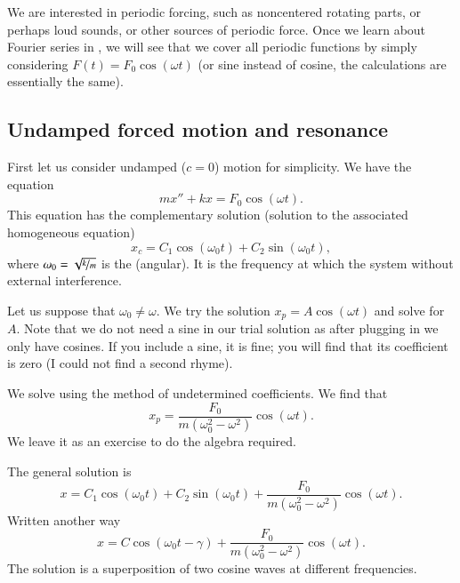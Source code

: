 We are interested in periodic
forcing, such as noncentered rotating parts, or perhaps loud sounds, or
other sources of periodic force.  Once we learn about Fourier series in
, we
will see that we cover all periodic functions
by simply considering $F(t) = F_0 \cos (\omega t)$ (or sine instead of cosine,
the calculations are essentially the same).

\subsection{Undamped forced motion and resonance}

First let us consider undamped ($c=0$) motion for simplicity.
We have the equation
\begin{equation*}
mx'' + kx = F_0 \cos (\omega t) .
\end{equation*}
This equation has the complementary solution (solution to the associated homogeneous
equation)
\begin{equation*}
x_c = C_1 \cos (\omega_0 t) + C_2 \sin (\omega_0 t) ,
\end{equation*}
where $\omega_0 = \sqrt{\nicefrac{k}{m}}$ is the
\emph{} (angular).  It is the frequency
at which the system  without external interference.

Let us suppose that $\omega_0 \not= \omega$.  We try the solution
$x_p = A \cos (\omega t)$ and solve for $A$.  Note that we do not need a sine
in our trial solution as after plugging in we only have cosines.
If you include a sine, it is fine; you will find that its
coefficient is zero (I could not find a second rhyme).

We solve using the method of undetermined coefficients.  We find that
\begin{equation*}
x_p = \frac{F_0}{m(\omega_0^2 - \omega^2)} \cos (\omega t) .
\end{equation*}
We leave it as an exercise to do the algebra required.

The general solution is
\begin{equation*}
\boxed{
~~
x = C_1 \cos (\omega_0 t) + C_2 \sin (\omega_0 t) +
\frac{F_0}{m(\omega_0^2 - \omega^2)} \cos (\omega t) .
~~
}
\end{equation*}
Written another way
\begin{equation*}
x = C \cos (\omega_0 t - \gamma) +
\frac{F_0}{m(\omega_0^2 - \omega^2)} \cos (\omega t) .
\end{equation*}
The solution is a superposition of two cosine waves at different frequencies.


